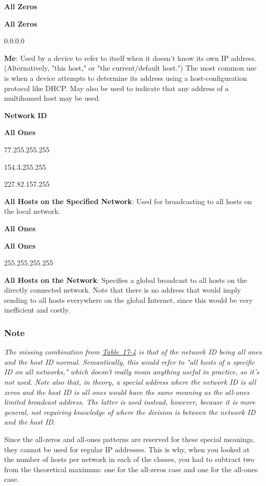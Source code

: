 \documentclass[b5paper,11pt]{memoir}
\begin{document}
{\textbf{All Zeros}}

{\textbf{All Zeros}}

0.0.0.0

{\textbf{Me}}: Used by a device to refer to itself when it doesn't know
its own IP address. (Alternatively, "this host," or "the current/default
host.") The most common use is when a device attempts to determine its
address using a host-configuration protocol like DHCP. May also be used
to indicate that any address of a multihomed host may be used.

{\textbf{Network ID}}

{\textbf{All Ones}}

77.255.255.255

154.3.255.255

227.82.157.255

{\textbf{All Hosts on the Specified Network}}: Used for broadcasting to
all hosts on the local network.

{\textbf{All Ones}}

{\textbf{All Ones}}

255.255.255.255

{\textbf{All Hosts on the Network}}: Specifies a global broadcast to all
hosts on the directly connected network. Note that there is no address
that would imply sending to all hosts everywhere on the global Internet,
since this would be very inefficient and costly.

\subsubsection[Note]{\texorpdfstring{\protect\hypertarget{ch17s04.htmlux5cux23note-66}{}{}Note}{Note}}

{\emph{The missing combination from
\protect\hyperlink{ch17s04.htmlux5cux23ip_address_patterns_with_special_meaning}{Table~17-4}
is that of the network ID being all ones and the host ID normal.
Semantically, this would refer to "all hosts of a specific ID on all
networks," which doesn't really mean anything useful in practice, so
it's not used. Note also that, in theory, a special address where the
network ID is all zeros and the host ID is all ones would have the same
meaning as the all-ones limited broadcast address. The latter is used
instead, however, because it is more general, not requiring knowledge of
where the division is between the network ID and the host ID}}.

Since the all-zeros and all-ones patterns are reserved for these special
meanings, they cannot be used for regular
\protect\hypertarget{ch17s04.htmlux5cux23idx-CHP-17-0697}{}{}IP
addresses. This is why, when you looked at the number of hosts per
network in each of the classes, you had to subtract two from the
theoretical maximum: one for the all-zeros case and one for the all-ones
case.\protect\hypertarget{ch17s04.htmlux5cux23idx-CHP-17-0698}{}{}
\end{document}
